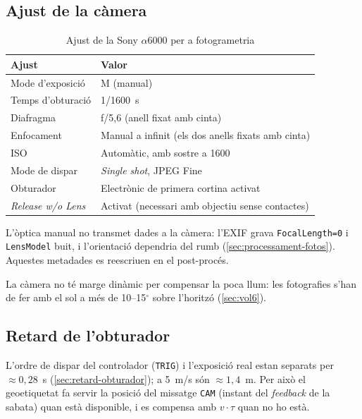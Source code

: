 \subsection{Ajust de la càmera}
\label{subsec:ajust-camera}

\begin{table}[H]
    \centering
    \caption{Ajust de la Sony $\alpha$6000 per a fotogrametria}
    \label{tab:ajust-camera}
    \begin{tabular}{ll}
        \toprule
        Ajust & Valor \\
        \midrule
        Mode d'exposició & M (manual) \\
        Temps d'obturació & 1/1600~s \\
        Diafragma & f/5,6 (anell fixat amb cinta) \\
        Enfocament & Manual a infinit (els dos anells fixats amb cinta) \\
        ISO & Automàtic, amb sostre a 1600 \\
        Mode de dispar & \emph{Single shot}, JPEG Fine \\
        Obturador & Electrònic de primera cortina activat \\
        \emph{Release w/o Lens} & Activat (necessari amb objectiu sense contactes) \\
        \bottomrule
    \end{tabular}
\end{table}

L'òptica manual no transmet dades a la càmera: l'EXIF grava \texttt{FocalLength=0} i \texttt{LensModel} buit, i l'orientació dependria del rumb (\cref{sec:processament-fotos}). Aquestes metadades es reescriuen en el post-procés.

La càmera no té marge dinàmic per compensar la poca llum: les fotografies s'han de fer amb el sol a més de 10--15$^{\circ}$ sobre l'horitzó (\cref{sec:vol6}).

\subsection{Retard de l'obturador}

L'ordre de dispar del controlador (\texttt{TRIG}) i l'exposició real estan separats per $\approx 0{,}28$~s (\cref{sec:retard-obturador}); a 5~m/s són $\approx 1{,}4$~m. Per això el geoetiquetat fa servir la posició del missatge \texttt{CAM} (instant del \emph{feedback} de la sabata) quan està disponible, i es compensa amb $v\cdot\tau$ quan no ho està.

